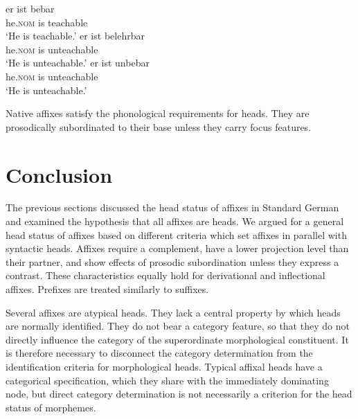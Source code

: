 \documentclass[output=paper
  ,nobabel
  ,draftmode
  ,colorlinks, citecolor=brown
]{langscibook}
\begin{document}
\eal
\ex
\gll er ist bebar \\
	he.\textsc{nom} is teachable\\
\glt	`He is teachable.'
\ex 
\gll er              ist belehrbar\\ 
     he.\textsc{nom} is  unteachable\\
\glt `He is unteachable.'
\ex
\gll er              ist unbebar \\
     he.\textsc{nom} is  unteachable\\
\glt `He is unteachable.'
\zl

\noindent 
Native affixes satisfy the phonological requirements for heads. They are prosodically subordinated to their base unless they carry focus features.

\section{Conclusion}\label{conclu-kor}

The previous sections discussed the head status of affixes in Standard German and examined the hypothesis that all affixes are heads. We argued for a general head status of affixes based on different criteria which set affixes in parallel with syntactic heads. Affixes require a complement, have a lower projection level than their partner, and show effects of prosodic subordination unless they express a contrast. These characteristics equally hold for derivational and inflectional affixes. Prefixes are treated similarly to suffixes.

Several affixes are atypical heads. They lack a central property by which heads are normally identified. They do not bear a category feature, so that they do not directly influence the category of the superordinate morphological constituent. It is therefore necessary to disconnect the category determination from the identification criteria for morphological heads. Typical affixal heads have a categorical specification, which they share with the immediately dominating node, but direct category determination is not necessarily a criterion for the head status of morphemes.
\end{document}
